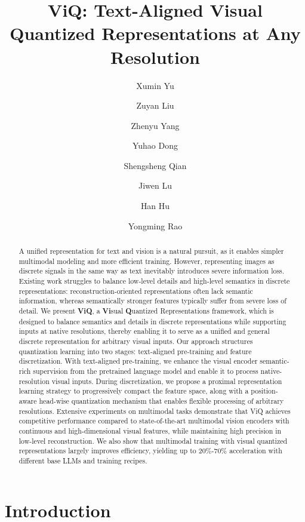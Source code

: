 \documentclass{llmxive}
\title{ViQ: Text-Aligned Visual Quantized Representations at Any Resolution}
\author{Xumin Yu \and Zuyan Liu \and Zhenyu Yang \and Yuhao Dong \and Shengsheng Qian \and Jiwen Lu \and Han Hu \and Yongming Rao}
\begin{document}
\maketitle
\begin{abstract}
A unified representation for text and vision is a natural pursuit, as it enables simpler multimodal modeling and more efficient training. However, representing images as discrete signals in the same way as text inevitably introduces severe information loss. Existing work struggles to balance low-level details and high-level semantics in discrete representations: reconstruction-oriented representations often lack semantic information, whereas semantically stronger features typically suffer from severe loss of detail. We present \textbf{ViQ}, a \textbf{Vi}sual \textbf{Q}uantized Representations framework, which is designed to balance semantics and details in discrete representations while supporting inputs at native resolutions, thereby enabling it to serve as a unified and general discrete representation for arbitrary visual inputs. Our approach structures quantization learning into two stages: text-aligned pre-training and feature discretization. With text-aligned pre-training, we enhance the visual encoder semantic-rich supervision from the pretrained language model and enable it to process native-resolution visual inputs. During discretization, we propose a proximal representation learning strategy to progressively compact the feature space, along with a position-aware head-wise quantization mechanism that enables flexible processing of arbitrary resolutions. Extensive experiments on multimodal tasks demonstrate that ViQ achieves competitive performance compared to state-of-the-art multimodal vision encoders with continuous and high-dimensional visual features, while maintaining high precision in low-level reconstruction. We also show that multimodal training with visual quantized representations largely improves efficiency, yielding up to 20\%-70\% acceleration with different base LLMs and training recipes.
\end{abstract}
\section{Introduction}
\label{sec:intro}
\end{document}

